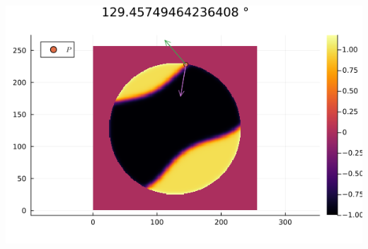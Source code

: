 \documentclass{mimosis}
\begin{document}
\begin{center}
\includegraphics[width=.9\linewidth]{images/angle.png}
\label{angle-evaluation}
\end{center}
\end{document}
